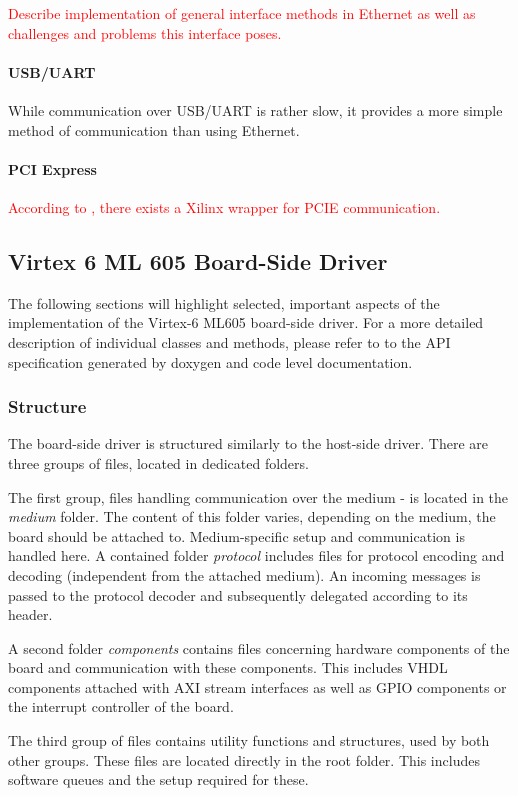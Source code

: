 \documentclass{report}
\begin{document}
\textcolor{red}{Describe implementation of general interface methods in Ethernet as well as challenges and problems this interface poses.}

\paragraph{USB/UART}
While communication over USB/UART is rather slow, it provides a more simple method of communication than using Ethernet. 

\paragraph{PCI Express}
\textcolor{red}{According to \cite{alachiotis10}, there exists a Xilinx wrapper for PCIE communication.}


\subsection{Virtex 6 ML 605 Board-Side Driver}
The following sections will highlight selected, important aspects of the implementation of the Virtex-6 ML605 board-side driver. For a more detailed description of individual classes and methods, please refer to to the API specification generated by doxygen and code level documentation.

\subsubsection{Structure}
The board-side driver is structured similarly to the host-side driver. There are three groups of files, located in dedicated folders. 

The first group, files handling communication over the medium - is located in the \textit{medium} folder. The content of this folder varies, depending on the medium, the board should be attached to. Medium-specific setup and communication is handled here. A contained folder \textit{protocol} includes files for protocol encoding and decoding (independent from the attached medium). An incoming messages is passed to the protocol decoder and subsequently delegated according to its header.

A second folder \textit{components} contains files concerning hardware components of the board and communication with these components. This includes VHDL components attached with AXI stream interfaces as well as GPIO components or the interrupt controller of the board.

The third group of files contains utility functions and structures, used by both other groups. These files are located directly in the root folder.  This includes software queues and the setup required for these.
\end{document}
